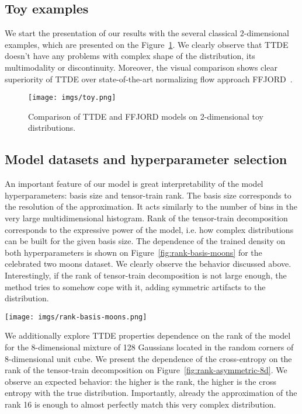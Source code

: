 \documentclass[accepted]{uai2021}
\begin{document}
  \subsection{Toy examples}
  We start the presentation of our results with the several classical $2$-dimensional examples, which are presented on the Figure~\ref{fig:toy}. We clearly observe that TTDE doesn't have any problems with complex shape of the distribution, its multimodality or discontinuity. Moreover, the visual comparison shows clear superiority of TTDE over state-of-the-art normalizing flow approach FFJORD~\citep{Grathwohl2018}.

  \begin{figure}[t]
    \centering
    \texttt{[image: imgs/toy.png]}
    \caption{Comparison of TTDE and FFJORD models on 2-dimensional toy distributions.} \label{fig:toy}
  \end{figure}


  \subsection{Model datasets and hyperparameter selection}
  An important feature of our model is great interpretability of the model hyperparameters: basis size and tensor-train rank. The basis size corresponds to the resolution of the approximation. It acts similarly to the number of bins in the very large multidimensional histogram. Rank of the tensor-train decomposition corresponds to the expressive power of the model, i.e. how complex distributions can be built for the given basis size. The dependence of the trained density on both hyperparameters is shown on Figure~\ref{fig:rank-basis-moons} for the celebrated two moons dataset. We clearly observe the behavior discussed above. Interestingly, if the rank of tensor-train decomposition is not large enough, the method tries to somehow cope with it, adding symmetric artifacts to the distribution.

  \begin{figure*}[t]
    \centering
    \texttt{[image: imgs/rank-basis-moons.png]}
    \caption{Approximations of ``two moons'' distribution by TTDE for different basis function set sizes and TT-ranks.} \label{fig:rank-basis-moons}
  \end{figure*}

  We additionally explore TTDE properties dependence on the rank of the model for the 8-dimensional mixture of 128 Gaussians located in the random corners of 8-dimensional unit cube. We present the dependence of the cross-entropy on the rank of the tensor-train decomposition on Figure~\ref{fig:rank-asymmetric-8d}. We observe an expected behavior: the higher is the rank, the higher is the cross entropy with the true distribution. Importantly, already the approximation of the rank 16 is enough to almost perfectly match this very complex distribution.
\end{document}
